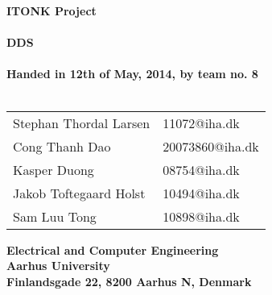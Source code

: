 \begin{titlepage}
\begin{center}
{\LARGE \textbf{ITONK Project}}\\~\\
{\LARGE \textbf{DDS}}\\~\\
\textbf{Handed in 12th of May, 2014, by team no. 8}\\~\\
\begin{tabular}{ll}
Stephan Thordal Larsen & 11072@iha.dk \\
Cong Thanh Dao & 20073860@iha.dk \\
Kasper Duong & 08754@iha.dk \\
Jakob Toftegaard Holst & 10494@iha.dk \\
Sam Luu Tong & 10898@iha.dk \\
\end{tabular}
\vfill
\textbf{Electrical and Computer Engineering}\\
\textbf{Aarhus University}\\
\textbf{Finlandsgade 22, 8200 Aarhus N, Denmark}
\end{center}
\end{titlepage} 